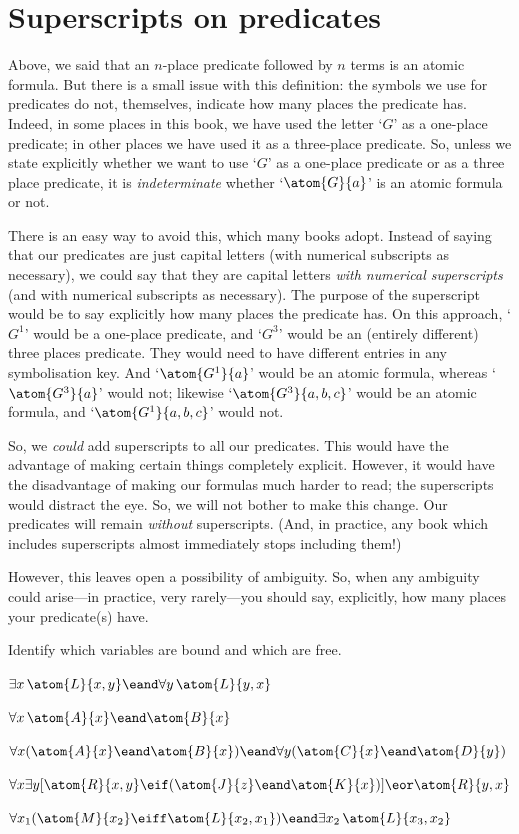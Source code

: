 \section{Superscripts on predicates}
Above, we said that an $n$-place predicate followed by $n$ terms is an atomic formula. But there is a small issue with this definition: the symbols we use for predicates do not, themselves, indicate how many places the predicate has. Indeed, in some places in this book, we have used the letter `$G$' as a one-place predicate; in other places we have used it as a three-place predicate. So, unless we state explicitly whether we want to use `$G$' as a one-place predicate or as a three place predicate, it is \emph{indeterminate} whether `$\atom{G}{a}$' is an atomic formula or not.

There is an easy way to avoid this, which many books adopt. Instead of saying that our predicates are just capital letters (with numerical subscripts as necessary), we could say that they are capital letters \emph{with numerical superscripts} (and with numerical subscripts as necessary). The purpose of the superscript would be to say explicitly how many places the predicate has. On this approach, `$G^1$' would be a one-place predicate, and `$G^3$' would be an (entirely different) three places predicate. They would need to have different entries in any symbolisation key. And `$\atom{G^1}{a}$' would be an atomic formula, whereas `$\atom{G^3}{a}$' would not; likewise `$\atom{G^3}{a,b,c}$' would be an atomic formula, and `$\atom{G^1}{a,b,c}$' would not.

So, we \emph{could} add superscripts to all our predicates. This would have the advantage of making certain things completely explicit. However, it would have the disadvantage of making our formulas much harder to read; the superscripts would distract the eye. So, we will not bother to make this change. Our predicates will remain \emph{without} superscripts.  (And, in practice, any book which includes superscripts almost immediately stops including them!)

However, this leaves open a possibility of ambiguity. So, when any ambiguity could arise---in practice, very rarely---you should say, explicitly, how many places your predicate(s) have.

\practiceproblems
\problempart
\label{pr.freeFOL}
Identify which variables are bound and which are free.
\begin{compactlist}
\item $\exists x\, \atom{L}{x,y} \eand \forall y\, \atom{L}{y,x}$
\item $\forall x\, \atom{A}{x} \eand \atom{B}{x}$
\item $\forall x (\atom{A}{x} \eand \atom{B}{x}) \eand \forall y(\atom{C}{x} \eand \atom{D}{y})$
\item $\forall x\exists y[\atom{R}{x,y} \eif (\atom{J}{z} \eand \atom{K}{x})] \eor \atom{R}{y,x}$
\item $\forall x_1(\atom{M}{x_2} \eiff \atom{L}{x_2,x_1}) \eand \exists x_2\,\atom{L}{x_3,x_2}$
\end{compactlist}


